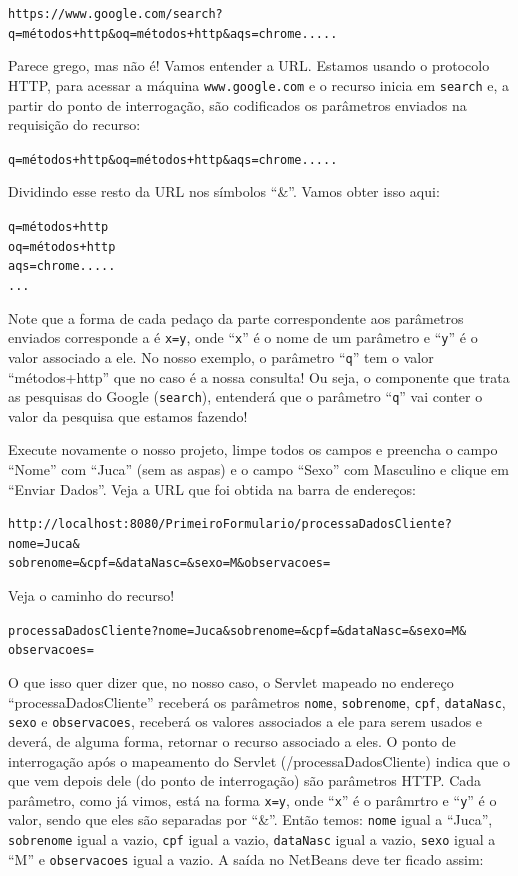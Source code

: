 \texttt{https://www.google.com/search?q=métodos+http\&oq=métodos+http\&aqs=chrome.....}

Parece grego, mas não é! Vamos entender a URL. Estamos usando o protocolo HTTP, para acessar a máquina \texttt{www.google.com} e o recurso inicia em \texttt{search} e, a partir do ponto de interrogação, são codificados os parâmetros enviados na requisição do recurso:

\texttt{q=métodos+http\&oq=métodos+http\&aqs=chrome.....}

Dividindo esse resto da URL nos símbolos ``\&''. Vamos obter isso aqui:

\texttt{q=métodos+http}\\
\texttt{oq=métodos+http}\\
\texttt{aqs=chrome.....}\\
\texttt{...}

Note que a forma de cada pedaço da parte correspondente aos parâmetros enviados corresponde a é \texttt{x=y}, onde ``\texttt{x}'' é o nome de um parâmetro e ``\texttt{y}'' é o valor associado a ele. No nosso exemplo, o parâmetro ``\texttt{q}'' tem o valor ``métodos+http'' que no caso é a nossa consulta! Ou seja, o componente que trata as pesquisas do Google (\texttt{search}), entenderá que o parâmetro ``\texttt{q}'' vai conter o valor da pesquisa que estamos fazendo!

Execute novamente o nosso projeto, limpe todos os campos e preencha o campo ``Nome'' com ``Juca'' (sem as aspas) e o campo ``Sexo'' com Masculino e clique em ``Enviar Dados''. Veja a URL que foi obtida na barra de endereços:

\texttt{http://localhost:8080/PrimeiroFormulario/processaDadosCliente?nome=Juca\&\\sobrenome=\&cpf=\&dataNasc=\&sexo=M\&observacoes=}

Veja o caminho do recurso!

\texttt{processaDadosCliente?nome=Juca\&sobrenome=\&cpf=\&dataNasc=\&sexo=M\&\\observacoes=}

O que isso quer dizer que, no nosso caso, o Servlet mapeado no endereço ``processaDadosCliente'' receberá os parâmetros \texttt{nome}, \texttt{sobrenome}, \texttt{cpf}, \texttt{dataNasc}, \texttt{sexo} e \texttt{observacoes}, receberá os valores associados a ele para serem usados e deverá, de alguma forma, retornar o recurso associado a eles. O ponto de interrogação após o mapeamento do Servlet (/processaDadosCliente) indica que o que vem depois dele (do ponto de interrogação) são parâmetros HTTP. Cada parâmetro, como já vimos, está na forma \texttt{x=y}, onde ``\texttt{x}'' é o parâmrtro e ``\texttt{y}'' é o valor, sendo que eles são separadas por ``\&''. Então temos: \texttt{nome} igual a ``Juca'', \texttt{sobrenome} igual a vazio, \texttt{cpf} igual a vazio, \texttt{dataNasc} igual a vazio, \texttt{sexo} igual a ``M'' e \texttt{observacoes} igual a vazio. A saída no NetBeans deve ter ficado assim:

